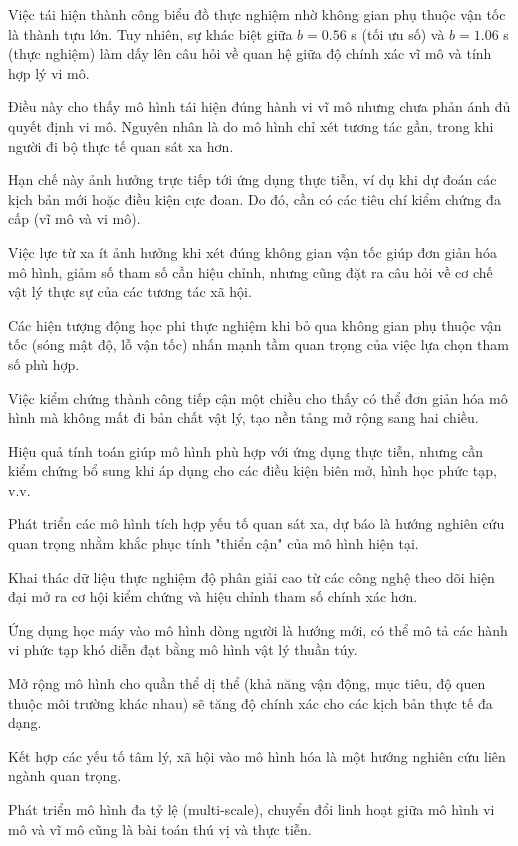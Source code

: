 \documentclass[12pt,a4paper]{article}
\begin{document}
Việc tái hiện thành công biểu đồ thực nghiệm nhờ không gian phụ thuộc vận tốc là thành tựu lớn. Tuy nhiên, sự khác biệt giữa $b = 0.56$ s (tối ưu số) và $b = 1.06$ s (thực nghiệm) làm dấy lên câu hỏi về quan hệ giữa độ chính xác vĩ mô và tính hợp lý vi mô.

Điều này cho thấy mô hình tái hiện đúng hành vi vĩ mô nhưng chưa phản ánh đủ quyết định vi mô. Nguyên nhân là do mô hình chỉ xét tương tác gần, trong khi người đi bộ thực tế quan sát xa hơn.

Hạn chế này ảnh hưởng trực tiếp tới ứng dụng thực tiễn, ví dụ khi dự đoán các kịch bản mới hoặc điều kiện cực đoan. Do đó, cần có các tiêu chí kiểm chứng đa cấp (vĩ mô và vi mô).

Việc lực từ xa ít ảnh hưởng khi xét đúng không gian vận tốc giúp đơn giản hóa mô hình, giảm số tham số cần hiệu chỉnh, nhưng cũng đặt ra câu hỏi về cơ chế vật lý thực sự của các tương tác xã hội.

Các hiện tượng động học phi thực nghiệm khi bỏ qua không gian phụ thuộc vận tốc (sóng mật độ, lỗ vận tốc) nhấn mạnh tầm quan trọng của việc lựa chọn tham số phù hợp.

Việc kiểm chứng thành công tiếp cận một chiều cho thấy có thể đơn giản hóa mô hình mà không mất đi bản chất vật lý, tạo nền tảng mở rộng sang hai chiều.

Hiệu quả tính toán giúp mô hình phù hợp với ứng dụng thực tiễn, nhưng cần kiểm chứng bổ sung khi áp dụng cho các điều kiện biên mở, hình học phức tạp, v.v.

Phát triển các mô hình tích hợp yếu tố quan sát xa, dự báo là hướng nghiên cứu quan trọng nhằm khắc phục tính "thiển cận" của mô hình hiện tại.

Khai thác dữ liệu thực nghiệm độ phân giải cao từ các công nghệ theo dõi hiện đại mở ra cơ hội kiểm chứng và hiệu chỉnh tham số chính xác hơn.

Ứng dụng học máy vào mô hình dòng người là hướng mới, có thể mô tả các hành vi phức tạp khó diễn đạt bằng mô hình vật lý thuần túy.

Mở rộng mô hình cho quần thể dị thể (khả năng vận động, mục tiêu, độ quen thuộc môi trường khác nhau) sẽ tăng độ chính xác cho các kịch bản thực tế đa dạng.

Kết hợp các yếu tố tâm lý, xã hội vào mô hình hóa là một hướng nghiên cứu liên ngành quan trọng.

Phát triển mô hình đa tỷ lệ (multi-scale), chuyển đổi linh hoạt giữa mô hình vi mô và vĩ mô cũng là bài toán thú vị và thực tiễn.
\end{document}
